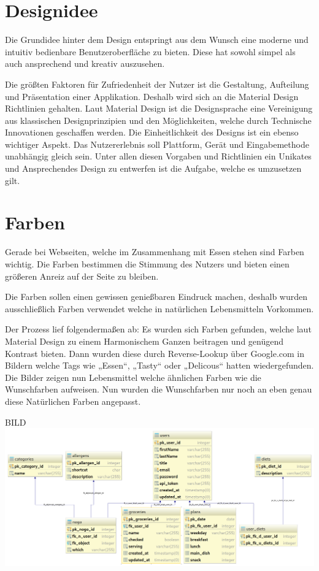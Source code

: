 \section{Designidee\cite{MaterialDesign}}

Die Grundidee hinter dem Design entspringt aus dem Wunsch eine moderne und intuitiv bedienbare Benutzeroberfläche zu bieten. Diese hat sowohl simpel als auch ansprechend und kreativ auszusehen.

Die größten Faktoren für Zufriedenheit der Nutzer ist die Gestaltung, Aufteilung und Präsentation einer Applikation. Deshalb wird sich an die Material Design Richtlinien gehalten. Laut Material Design ist die Designsprache eine Vereinigung aus klassischen Designprinzipien und den Möglichkeiten, welche durch Technische Innovationen geschaffen werden.
Die Einheitlichkeit des Designs ist ein ebenso wichtiger Aspekt. Das Nutzererlebnis soll Plattform, Gerät und Eingabemethode unabhängig gleich sein.
Unter allen diesen Vorgaben und Richtlinien ein Unikates und Ansprechendes Design zu entwerfen ist die Aufgabe, welche es umzusetzen gilt.


\section{Farben\cite{MaterialDesignColors}}
Gerade bei Webseiten, welche im Zusammenhang mit Essen stehen sind Farben wichtig. Die Farben bestimmen die Stimmung des Nutzers und bieten einen größeren Anreiz auf der Seite zu bleiben.

Die Farben sollen einen gewissen genießbaren Eindruck machen, deshalb wurden ausschließlich Farben verwendet welche in natürlichen Lebensmitteln Vorkommen.

Der Prozess lief folgendermaßen ab:
Es wurden sich Farben gefunden, welche laut Material Design zu einem Harmonischem Ganzen beitragen und genügend Kontrast bieten. Dann wurden diese durch Reverse-Lookup über Google.com in Bildern welche Tags wie „Essen“, „Tasty“ oder „Delicous“ hatten wiedergefunden. Die Bilder zeigen nun Lebensmittel welche ähnlichen Farben wie die Wunschfarben aufweisen. Nun wurden die Wunschfarben nur noch an eben genau diese Natürlichen Farben angepasst.

BILD
\includegraphics{threesixfive.png}


